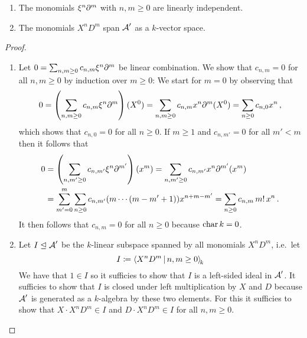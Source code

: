 \begin{lemma}
  \label{lemma: preparation for weyl basis}
  \leavevmode
  \begin{enumerate}
    \item
      The monomials $\xi^n \partial^m$ with $n, m \geq 0$ are linearly independent.
    \item
      The monomials $X^n D^m$ span $\operatorname{\mathcal{A}}'$ as a $k$-vector space.
  \end{enumerate}
\end{lemma}


\begin{proof}
  \leavevmode
  \begin{enumerate}
    \item
      Let $0 = \sum_{n, m \geq 0} c_{n,m} \xi^n \partial^m$ be linear combination.
      We show that $c_{n,m} = 0$ for all $n, m \geq 0$ by induction over $m \geq 0$:
      We start for $m = 0$ by observing that
      \[
          0
        = \left( \sum_{n, m \geq 0} c_{n,m} \xi^n \partial^m \right)(X^0)
        = \sum_{n, m \geq 0} c_{n,m} x^n \partial^m(X^0)
        = \sum_{n \geq 0} c_{n,0} x^n \,,
      \]
      which shows that $c_{n,0} = 0$ for all $n \geq 0$.
      If $m \geq 1$ and $c_{n,m'} = 0$ for all $m' < m$ then it follows that
      \begin{align*}
            0
        &=  \left( \sum_{n, m' \geq 0} c_{n,m'} \xi^n \partial^{m'} \right)(x^m)
         =  \sum_{n, m' \geq 0} c_{n,m'} x^n \partial^{m'}(x^m)
        \\
        &=  \sum_{m'=0}^m \sum_{n \geq 0} c_{n,m'} (m \dotsm (m-m'+1)) x^{n+m-m'}
         =  \sum_{n \geq 0} c_{n,m} \, m! \, x^n \,.
      \end{align*}
      It then follows that $c_{n,m} = 0$ for all $n \geq 0$ because $\operatorname{char} k = 0$.
    \item
      Let $I \trianglelefteq \operatorname{\mathcal{A}}'$ be the $k$-linear subspace spanned by all monomials $X^n D^m$, i.e.\ let
      \[
                  I
        \defined  \left\langle
                    X^n D^m
                  \suchthat*
                    n, m \geq 0
                  \right\rangle_{\!k}
      \]
      We have that $1 \in I$ so it sufficies to show that $I$ is a left-sided ideal in $\operatorname{\mathcal{A}}'$.
      It sufficies to show that $I$ is closed under left multiplication by $X$ and $D$ because $\operatorname{\mathcal{A}}'$ is generated as a $k$-algebra by these two elements.
      For this it sufficies to show that $X \cdot X^n D^m \in I$ and $D \cdot X^n D^m \in I$ for all $n, m \geq 0$.
      

\end{enumerate}
\end{proof}
